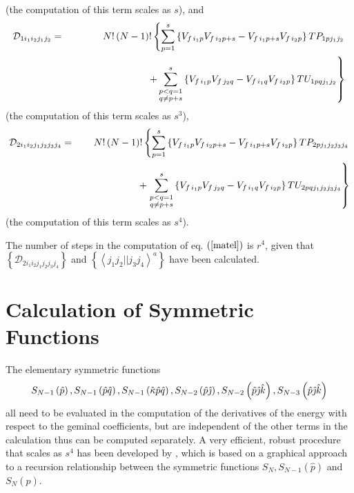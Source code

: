 \documentclass[aps,preprint]{revtex4}
\begin{document}
(the computation of this term scales as $s$), and 
\begin{eqnarray}
\mathcal{D}_{1i_{1}i_{2}j_{1}j_{2}} &=&N!\left( N-1\right) !\left\{
\sum_{p=1}^{s}\left\{
V_{f\,i_{1}p}V_{f\,i_{2}p+s}-V_{f\,i_{1}p+s}V_{f\,i_{2}p}\right\}
TP_{1pj_{1}j_{2}}\right.   \notag \\
&&\qquad \qquad \qquad \qquad \left. +\sum_{\substack{ p<q=1 \\ q\neq p+s}}%
^{s}\left\{ V_{f\,i_{1}p}V_{f\,j_{2}q}-V_{f\,i_{1}q}V_{f\,i_{2}p}\right\}
TU_{1pqj_{1}j_{2}}\right\} 
\end{eqnarray}%
(the computation of this term scales as $s^{3}$), 
\begin{eqnarray}
\mathcal{D}_{2i_{1}i_{2}j_{1}j_{2}j_{3}j_{4}} &=&N!\left( N-1\right)
!\left\{ \sum_{p=1}^{s}\left\{
V_{f\,i_{1}p}V_{f\,i_{2}p+s}-V_{f\,i_{1}p+s}V_{f\,i_{2}p}\right\}
TP_{2pj_{1}j_{2}j_{3}j_{4}}\right.   \notag \\
&&\qquad \qquad \qquad +\left. \sum_{\substack{ p<q=1 \\ q\neq p+s}}%
^{s}\left\{ V_{f\,i_{1}p}V_{f\,j_{2}q}-V_{f\,i_{1}q}V_{f\,i_{2}p}\right\}
TU_{2pqj_{1}j_{2}j_{3}j_{4}}\right\} 
\end{eqnarray}%
(the computation of this term scales as $s^{4}$).

The number of steps in the computation of eq. $\left( \ref{matel}\right) $
is $r^{4}$, given that $\left\{ \mathcal{D}%
_{2i_{1}i_{2}j_{1}j_{2}j_{3}j_{4}}\right\} $ and $\left\{ \left\langle
j_{1}j_{2}||j_{3}j_{4}\right\rangle ^{a}\right\} $ have been calculated.

\section{Calculation of Symmetric Functions}

The elementary symmetric functions 
\begin{equation}
S_{N-1}\left( \hat{p}\right) ,S_{N-1}\left( \hat{p}\hat{q}\right)
,S_{N-1}\left( \hat{\kappa}\hat{p}\hat{q}\right) ,S_{N-2}\left( \hat{p}\hat{%
\jmath}\right) ,S_{N-2}\left( \hat{p}\hat{\jmath}\hat{k}\right)
,S_{N-3}\left( \hat{p}\hat{\jmath}\hat{k}\right) 
\end{equation}%
all need to be evaluated in the computation of the derivatives of the energy
with respect to the geminal coefficients, but are independent of the other
terms in the calculation thus can be computed separately. A very efficient,
robust procedure that scales as $s^{4}$ has been developed by \cite{Jensen80}%
\cite{Jensen81}, which is based on a graphical approach to a recursion
relationship between the symmetric functions $S_{N},S_{N-1}\left( \hat{p}%
\right) $ and $S_{N}\left( \hat{p}\right) $.
\end{document}
